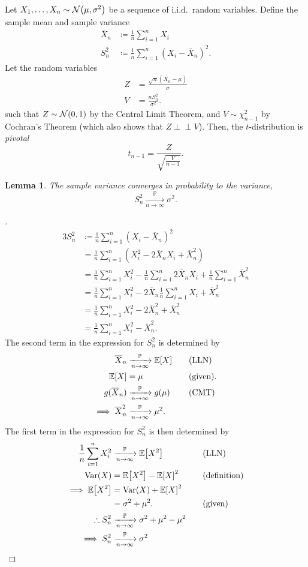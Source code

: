 \documentclass[letterpaper, oneside, reqno]{amsart}
\newtheorem{lemma}[theorem]{Lemma}
\renewcommand{\qedsymbol}{\ensuremath{\blacksquare}}
\newenvironment{subproof}[1][\proofname]{%
  \renewcommand{\qedsymbol}{\ensuremath{\square}}%
  \begin{proof}[#1]%
}{%
  \end{proof}%
}
\numberwithin{equation}{section}
\newcommand{\ddfrac}[2]{\frac{\displaystyle #1}{\displaystyle #2}}
\newcommand{\E}[1]{\mathbb{E}\mleft[#1\mright]}
\newcommand{\Var}[1]{\operatorname{Var}\mleft(#1\mright)}
\newcommand{\N}[2]{\mathcal{N}\mleft( #1, #2 \mright)}
\newcommand{\indep}{\perp \!\!\! \perp}  %
\newcommand{\iid}{i.i.d.}
\newcommand{\sumi}[2]{\sum_{#1=1}^{#2}}
\newcommand{\avg}[2]{\frac{1}{#2}\sumi{#1}{#2}}
\newcommand{\by}[1]{&\quad&\text{(#1)}}
\newcommand{\Plim}{\xrightarrow[n \to \infty]{\mathbb{P}}}
\newcommand{\Xnbar}{\overline{X}_n}
\begin{document}
Let $X_1, \dots, X_n \sim \N{\mu}{\sigma^2}$ be a sequence of \iid\ random
variables. Define the sample mean and sample variance
\begin{align*}
  \Xnbar &\coloneqq \avg{i}{n} X_i \\
  S_n^2 &\coloneqq \avg{i}{n} (X_i - \Xnbar)^2.
\end{align*}
Let the random variables
\begin{align*}
  Z &= \frac{\sqrt{n}(\Xnbar - \mu)}{\sigma} \\
  V &= \frac{n S_n^2}{\sigma^2}.
\end{align*}
such that $Z \sim \N{0}{1}$ by the Central Limit Theorem, and $V \sim
\chi^2_{n-1}$ by Cochran's Theorem (which also shows that $Z \indep V$).
Then, the $t$-distribution is \emph{pivotal}
\[  t_{n-1} = \ddfrac{Z}{\sqrt{\frac{V}{n-1}}}. \]

\begin{lemma}
  The sample variance converges in probability to the variance,
  \[ S_n^2 \Plim \sigma^2. \]
\end{lemma}

\begin{subproof}
  \begin{alignat*}{3}
    S_n^2 &\coloneqq \avg{i}{n}(X_i - \Xnbar)^2 \\
          &= \avg{i}{n}(X_i^2 - 2 \Xnbar X_i + \Xnbar^2) \\
          &= \avg{i}{n} X_i^2 - \avg{i}{n} 2 \Xnbar X_i + \avg{i}{n} \Xnbar^2  \\
          &= \avg{i}{n} X_i^2 - 2 \Xnbar \avg{i}{n} X_i + \Xnbar^2  \\
          &= \avg{i}{n} X_i^2 - 2 \Xnbar^2  + \Xnbar^2  \\
          &= \avg{i}{n} X_i^2 - \Xnbar^2.
  \end{alignat*}
  The second term in the expression for $S_n^2$ is determined by
  \begin{alignat*}{3}
    \Xnbar &\Plim \E{X} \by{LLN} \\
    \E{X} &= \mu \by{given}. \\
    g(\Xnbar) &\Plim g(\mu) \by{CMT} \\
    \implies \Xnbar^2 &\Plim \mu^2.
  \end{alignat*}
  The first term in the expression for $S_n^2$ is then determined by
  \begin{alignat*}{3}
    \avg{i}{n} X_i^2 &\Plim \E{X^2} \by{LLN} \\
    \Var{X} &= \E{X^2} - \E{X}^2 \by{definition} \\
    \implies \E{X^2} &= \Var{X} + \E{X}^2 \\
                     &= \sigma^2 + \mu^2. \by{given} \\
    \therefore S_n^2 &\Plim \sigma^2 + \mu^2 - \mu^2 \\
    \implies S_n^2 &\Plim \sigma^2 \qedhere
  \end{alignat*}
\end{subproof}
\end{document}
